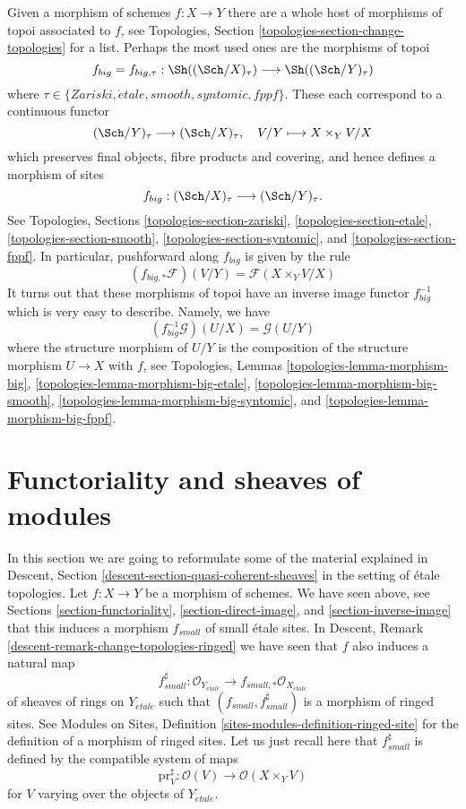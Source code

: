 \noindent
Given a morphism of schemes $f : X \to Y$ there are a whole host of
morphisms of topoi associated to $f$, see
Topologies, Section \ref{topologies-section-change-topologies}
for a list. Perhaps the most used ones are the morphisms of topoi
$$
f_{big} = f_{big, \tau} :
\Sh((\Sch/X)_\tau)
\longrightarrow
\Sh((\Sch/Y)_\tau)
$$
where $\tau \in \{Zariski, \acute{e}tale, smooth, syntomic, fppf\}$.
These each correspond to a continuous functor
$$
(\Sch/Y)_\tau \longrightarrow (\Sch/X)_\tau, \quad
V/Y \longmapsto X \times_Y V/X
$$
which preserves final objects, fibre products and covering, and hence
defines a morphism of sites
$$
f_{big} : (\Sch/X)_\tau \longrightarrow (\Sch/Y)_\tau.
$$
See
Topologies, Sections \ref{topologies-section-zariski},
\ref{topologies-section-etale},
\ref{topologies-section-smooth},
\ref{topologies-section-syntomic}, and
\ref{topologies-section-fppf}.
In particular, pushforward along $f_{big}$ is given by the rule
$$
(f_{big, *}\mathcal{F})(V/Y) = \mathcal{F}(X \times_Y V/X)
$$
It turns out that these morphisms of topoi have an inverse
image functor $f_{big}^{-1}$ which is very easy to describe.
Namely, we have
$$
(f_{big}^{-1}\mathcal{G})(U/X) = \mathcal{G}(U/Y)
$$
where the structure morphism of $U/Y$ is the composition of the
structure morphism $U \to X$ with $f$, see
Topologies, Lemmas \ref{topologies-lemma-morphism-big},
\ref{topologies-lemma-morphism-big-etale},
\ref{topologies-lemma-morphism-big-smooth},
\ref{topologies-lemma-morphism-big-syntomic}, and
\ref{topologies-lemma-morphism-big-fppf}.







\section{Functoriality and sheaves of modules}
\label{section-morphisms-modules}

\noindent
In this section we are going to reformulate some of the material explained in
Descent, Section \ref{descent-section-quasi-coherent-sheaves}
in the setting of \'etale topologies. Let $f : X \to Y$ be a morphism of
schemes. We have seen above, see
Sections \ref{section-functoriality}, \ref{section-direct-image}, and
\ref{section-inverse-image}
that this induces a morphism $f_{small}$ of small \'etale sites. In
Descent, Remark \ref{descent-remark-change-topologies-ringed}
we have seen that $f$ also induces a natural map
$$
f_{small}^\sharp :
\mathcal{O}_{Y_{\acute{e}tale}}
\longrightarrow
f_{small, *}\mathcal{O}_{X_{\acute{e}tale}}
$$
of sheaves of rings on
$Y_{\acute{e}tale}$ such that $(f_{small}, f_{small}^\sharp)$
is a morphism of ringed sites. See
Modules on Sites, Definition \ref{sites-modules-definition-ringed-site}
for the definition of a morphism of ringed sites.
Let us just recall here that $f_{small}^\sharp$ is defined by the
compatible system of maps
$$
\text{pr}_V^\sharp : \mathcal{O}(V) \longrightarrow \mathcal{O}(X \times_Y V)
$$
for $V$ varying over the objects of $Y_{\acute{e}tale}$.

